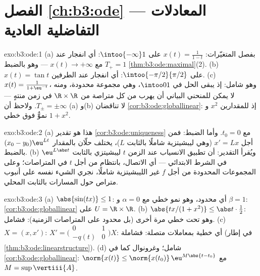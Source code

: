\section*{الفصل \ref{ch:b3:ode} --- المعادلات التفاضلية
العادية}

\begin{solution}{exo:b3:ode:1}
(a) بفصل المتغيّرات: $x(t) = \frac1{1 - t}$ على $\intoo{-\infty}1$: أي انفجار عند $T_+ = 1$
مع $x(t) \to
+\infty$ --- وهو بالضبط \cref{thm:b3:ode:maximal}(2).
(b) $x(t) = \tan t$ على $\intoo{-\pi/2}{\pi/2}$: أي انفجار عند الطرفين.
(c) $x(t) = \frac{1}{1 + \eu^{-t}}$، وهو شامل: إذ يبقى الحل في $\intoo01$، وهي مجموعة
محدودة، ومنه لا يمكن للمنحني البياني أن يهرب من كل متراصة من
$\R\times\R$ في زمن منتهٍ --- $T_\pm
= \pm\infty$. ولاحظ أن (a) و(b) لا
تناقضان \cref{cor:b3:ode:globallinear}: إذ للمقدارين $x^2$ و $1 + x^2$ نموٌّ فوق
خطي.
\end{solution}

\begin{solution}{exo:b3:ode:2}
(a) هذا هو تقدير \cref{cor:b3:ode:uniqueness} مع $t_0
= 0$. وأما الضبط: فمن أجل
$x' = Lx$ (وهي ليبشيتزية شاملًا بالثابت $L$)، يختلف حلّان
بالمقدار $(x_0 - y_0)\eu^{Lt}$ بالضبط.
(b) ويُقرأ التقدير: أن تطبيق الانسياب عند الزمن $t$ ليبشيتزي
بالثابت $\eu^{L\abs t}$ في الشرط الابتدائي --- أي الاتصال،
بانتظام من أجل $t$ في المتراصات؛ وعلى المجموعات المحدودة من
أجل $f$ غير الليبشيتزية شاملًا، نجري الشيء نفسه على أنبوب
متراص حول المسارات بالثابت المحلي.
\end{solution}

\begin{solution}{exo:b3:ode:3}
(a) $\abs{\sin(tx)} \leq 1$: أي محدود، وهو نمو خطي مع $\alpha = 0$ و
$\beta = 1$: \cref{cor:b3:ode:globallinear} على $U = \R\times\R$.
(b) $\abs{tx/(1 + x^2)} \leq \abs t\cdot\frac12$: وهو تحت خطي مرة أخرى (بل محدود على المتراصات
الزمنية): فشامل.
(c) $X = (x, x')$: $X' = \bigl(\begin{smallmatrix}0 & 1\\ -q(t)
& 0\end{smallmatrix}\bigr)X$: أي خطية بمعاملات متصلة: فشاملة (في
إطار \cref{thm:b3:ode:linearstructure}).
(d) شامل؛ وغرونوال كما في \cref{cor:b3:ode:globallinear}: $\norm{x(t)} \leq \norm{x(t_0)}\,\eu^{M\abs{t - t_0}}$ مع $M = \sup\vertiii{A}$.
\end{solution}

